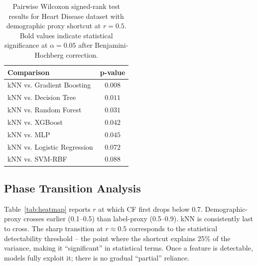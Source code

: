 \documentclass[conference]{IEEEtran}
\begin{document}
\begin{table}[t]
    \centering
    \footnotesize
    \setlength{\tabcolsep}{3pt}
    \caption{Pairwise Wilcoxon signed-rank test results for Heart Disease dataset with demographic proxy shortcut at $r=0.5$. Bold values indicate statistical significance at $\alpha=0.05$ after Benjamini-Hochberg correction.}
    \label{tab:significance}
    \begin{tabular}{lc}
        \toprule
        \textbf{Comparison} & \textbf{p-value} \\
        \midrule
        kNN vs. Gradient Boosting & $\mathbf{0.008}$ \\
        kNN vs. Decision Tree & $\mathbf{0.011}$ \\
        kNN vs. Random Forest & $\mathbf{0.031}$ \\
        kNN vs. XGBoost & $\mathbf{0.042}$ \\
        kNN vs. MLP & $\mathbf{0.045}$ \\
        kNN vs. Logistic Regression & 0.072 \\
        kNN vs. SVM-RBF & 0.088 \\
        \bottomrule
    \end{tabular}
\end{table}

\subsection{Phase Transition Analysis}

Table~\ref{tab:heatmap} reports $r$ at which CF first drops below 0.7. Demographic-proxy crosses earlier (0.1--0.5) than label-proxy (0.5--0.9). kNN is consistently last to cross. The sharp transition at $r \approx 0.5$ corresponds to the statistical detectability threshold -- the point where the shortcut explains 25\% of the variance, making it ``significant'' in statistical terms. Once a feature is detectable, models fully exploit it; there is no gradual ``partial'' reliance.
\end{document}
